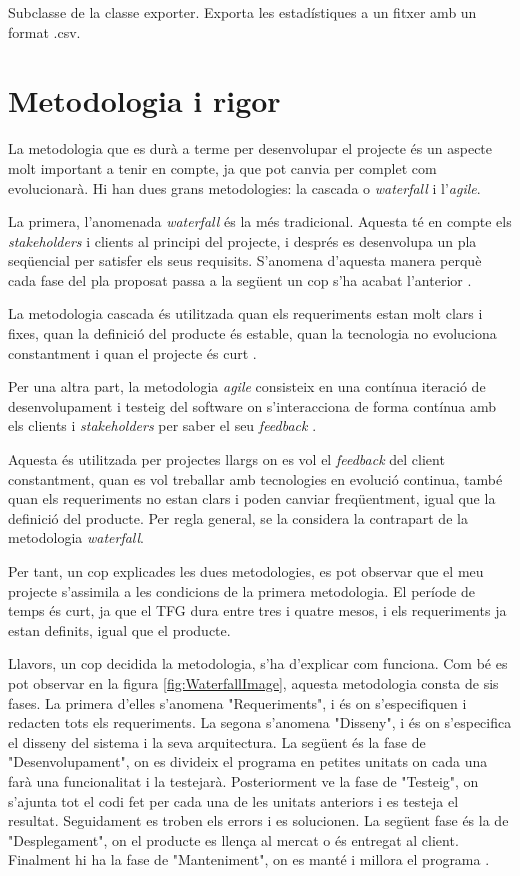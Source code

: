 \documentclass[a4paper]{article}
\begin{document}
Subclasse de la classe exporter. Exporta les estadístiques a un fitxer amb un format .csv.

\newpage
\section{Metodologia i rigor}
La metodologia que es durà a terme per desenvolupar el projecte és un aspecte molt important a tenir en compte, ja que pot canvia per complet com evolucionarà. Hi han dues grans metodologies: la cascada o \textit{waterfall} i l'\textit{agile}.

La primera, l'anomenada \textit{waterfall} és la més tradicional. Aquesta té en compte els \textit{stakeholders} i clients al principi del projecte, i després es desenvolupa un pla seqüencial per satisfer els seus requisits. S'anomena d'aquesta manera perquè cada fase del pla proposat passa a la següent un cop s'ha acabat l'anterior \cite{waterfallModel}.

La metodologia cascada és utilitzada quan els requeriments estan molt clars i fixes, quan la definició del producte és estable, quan la tecnologia no evoluciona constantment i quan el projecte és curt \cite{waterfallTutorialsPoint}.

Per una altra part, la metodologia \textit{agile} consisteix en una contínua iteració de desenvolupament i testeig del software on s'interacciona de forma contínua amb els clients i \textit{stakeholders} per saber el seu \textit{feedback} \cite{agileVsWaterfall}.

Aquesta és utilitzada per projectes llargs on es vol el \textit{feedback} del client constantment, quan es vol treballar amb tecnologies en evolució continua, també quan els requeriments no estan clars i poden canviar freqüentment, igual que la definició del producte. Per regla general, se la considera la contrapart de la metodologia \textit{waterfall}. 

Per tant, un cop explicades les dues metodologies, es pot observar que el meu projecte s'assimila a les condicions de la primera metodologia. El període de temps és curt, ja que el TFG dura entre tres i quatre mesos, i els requeriments ja estan definits, igual que el producte.

Llavors, un cop decidida la metodologia, s'ha d'explicar com funciona. Com bé es pot observar en la figura \ref{fig:WaterfallImage}, aquesta metodologia consta de sis fases. La primera d'elles s'anomena "Requeriments", i és on s'especifiquen i redacten tots els requeriments. La segona s'anomena "Disseny", i és on s'especifica el disseny del sistema i la seva arquitectura. La següent és la fase de "Desenvolupament", on es divideix el programa en petites unitats on cada una farà una funcionalitat i la testejarà. Posteriorment ve la fase de "Testeig", on s'ajunta tot el codi fet per cada una de les unitats anteriors i es testeja el resultat. Seguidament es troben els errors i es solucionen. La següent fase és la de "Desplegament", on el producte es llença al mercat o és entregat al client. Finalment hi ha la fase de "Manteniment", on es manté i millora el programa \cite{waterfallImage}. 
\end{document}
